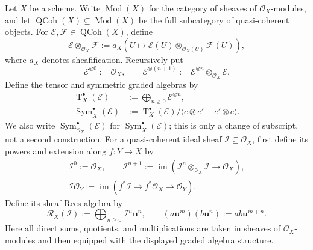 \begin{definition}
  \label{def:nagata-qcoh-graded-algebra-interface}

  Let $X$ be a scheme.  Write $\operatorname{Mod}(X)$ for the category of
  sheaves of $\mathcal O_X$-modules, and let
  $\operatorname{QCoh}(X)\subseteq\operatorname{Mod}(X)$ be the full
  subcategory of quasi-coherent objects.  For
  $\mathcal E,\mathcal F\in\operatorname{QCoh}(X)$, define
  \[
    \mathcal E\otimes_{\mathcal O_X}\mathcal F
      :=a_X\!\left(
        U\longmapsto
        \mathcal E(U)\otimes_{\mathcal O_X(U)}\mathcal F(U)
      \right),                                                   \tag{MLQC0}
  \]
  where $a_X$ denotes sheafification.  Recursively put
  \[
    \mathcal E^{\otimes0}:=\mathcal O_X,
    \qquad
    \mathcal E^{\otimes(n+1)}
      :=\mathcal E^{\otimes n}\otimes_{\mathcal O_X}\mathcal E.
                                                                    \tag{MLQC1}
  \]
  Define the tensor and symmetric graded algebras by
  \[
  \begin{aligned}
    \operatorname T_X^\bullet(\mathcal E)
      &:=\bigoplus_{n\geq0}\mathcal E^{\otimes n},\\
    \operatorname{Sym}_X^\bullet(\mathcal E)
      &:=\operatorname T_X^\bullet(\mathcal E)/
        \langle e\otimes e'-e'\otimes e\rangle .
  \end{aligned}                                                    \tag{MLQC2}
  \]
  We also write
  $\operatorname{Sym}_{\mathcal O_X}^\bullet(\mathcal E)$ for
  $\operatorname{Sym}_X^\bullet(\mathcal E)$; this is only a change of
  subscript, not a second construction.
  For a quasi-coherent ideal sheaf
  $\mathcal I\subseteq\mathcal O_X$, first define its powers and extension
  along $f\colon Y\to X$ by
  \[
  \begin{gathered}
    \mathcal I^0:=\mathcal O_X,\qquad
    \mathcal I^{n+1}:=
      \operatorname{im}\!\left(
        \mathcal I^n\otimes_{\mathcal O_X}\mathcal I
          \longrightarrow\mathcal O_X\right),\\
    \mathcal I\mathcal O_Y:=
      \operatorname{im}\!\left(
        f^*\mathcal I\longrightarrow f^*\mathcal O_X
          \longrightarrow\mathcal O_Y\right).
  \end{gathered}                                                   \tag{MLQC2a}
  \]
  Define its sheaf Rees algebra by
  \[
    \mathcal R_X(\mathcal I)
      :=\bigoplus_{n\geq0}\mathcal I^n\mathbf u^n,
    \qquad
    (a\mathbf u^m)(b\mathbf u^n):=ab\mathbf u^{m+n}.              \tag{MLQC3}
  \]
  Here all direct sums, quotients, and multiplications are taken in sheaves
  of $\mathcal O_X$-modules and then equipped with the displayed graded
  algebra structure.


\end{definition}

